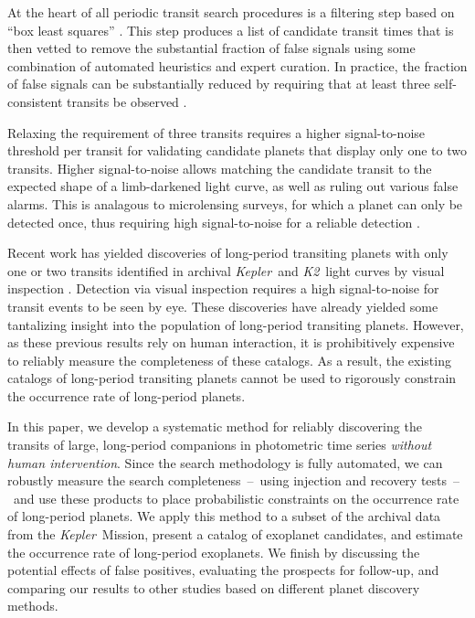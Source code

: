 \documentclass[manuscript, letterpaper]{aastex6}
\newcommand{\project}[1]{\textsl{#1}}
\newcommand{\kepler}{\project{Kepler}}
\newcommand{\KT}{\project{K2}}
\newcommand{\bls}{\project{BLS}}
\newcommand{\paper}{paper}
\begin{document}
At the heart of all periodic transit search procedures is a filtering step
based on ``box least squares'' \citep[\bls;][]{Kovacs:2002}.
This step produces a list of candidate transit times that is then vetted to
remove the substantial fraction of false signals using some combination of
automated heuristics and expert curation.
In practice, the fraction of false signals can be substantially reduced by
requiring that at least three self-consistent transits be observed
\citep{Petigura:2013, Burke:2014, Rowe:2015, Coughlin:2016}.

Relaxing the requirement of three transits requires a higher signal-to-noise
threshold per transit for validating candidate planets that display only one
to two transits.
Higher signal-to-noise allows matching the candidate transit to the expected
shape of a limb-darkened light curve, as well as ruling out various false
alarms.  This is analagous to microlensing surveys, for which a planet can only be
detected once, thus requiring high signal-to-noise for a reliable detection
\citep{Gould:2004}.

Recent work has yielded discoveries of long-period transiting planets with
only one or two transits identified in archival \kepler\ and \KT\ light curves
by visual inspection \citep{Wang:2013, Kipping:2014a, Osborn:2016,
Kipping:2016, Uehara:2016, Wang:2015}.  Detection via visual inspection requires
a high signal-to-noise for transit events to be seen by eye.
These discoveries have already yielded some tantalizing insight into the
population of long-period transiting planets.  However, as these previous results
rely on human interaction, it is prohibitively expensive to reliably measure
the completeness of these catalogs.
As a result, the existing catalogs of long-period transiting planets cannot be
used to rigorously constrain the occurrence rate of long-period planets.

In this \paper, we develop a systematic method for reliably discovering the
transits of large, long-period companions in photometric time series
\emph{without human intervention}.
Since the search methodology is fully automated, we can robustly measure the
search completeness~--~using injection and recovery tests~--~and use these
products to place probabilistic constraints on the occurrence rate of
long-period planets.
We apply this method to a subset of the archival data from the \kepler\
Mission, present a catalog of exoplanet candidates, and estimate the
occurrence rate of long-period exoplanets.
We finish by discussing the potential effects of false positives, evaluating the
prospects for follow-up, and comparing our results to other studies
based on different planet discovery methods.
\end{document}
